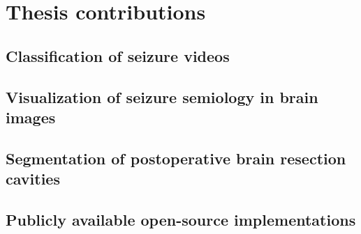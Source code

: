 \section{Thesis contributions}

\subsection{Classification of seizure videos}

\subsection{Visualization of seizure semiology in brain images}

\subsection{Segmentation of postoperative brain resection cavities}

\subsection{Publicly available open-source implementations}
